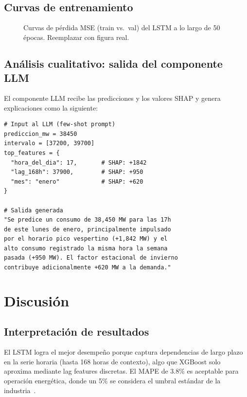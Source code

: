 \documentclass[10pt,twocolumn]{article}
\begin{document}
\subsection{Curvas de entrenamiento}

\begin{figure}[H]
  \centering
  \fbox{\rule{0pt}{3cm}\rule{\columnwidth-2\fboxsep}{0pt}}
  \caption{Curvas de pérdida MSE (train vs.\ val) del LSTM
           a lo largo de 50 épocas. Reemplazar con figura real.}
  \label{fig:curvas}
\end{figure}

\subsection{Análisis cualitativo: salida del componente LLM}

El componente LLM recibe las predicciones y los valores SHAP
y genera explicaciones como la siguiente:

\begin{lstlisting}[caption={Ejemplo de explicación generada por LLaMA-3.1}]
# Input al LLM (few-shot prompt)
prediccion_mw = 38450
intervalo = [37200, 39700]
top_features = {
  "hora_del_dia": 17,       # SHAP: +1842
  "lag_168h": 37900,        # SHAP: +950
  "mes": "enero"            # SHAP: +620
}

# Salida generada
"Se predice un consumo de 38,450 MW para las 17h
de este lunes de enero, principalmente impulsado
por el horario pico vespertino (+1,842 MW) y el
alto consumo registrado la misma hora la semana
pasada (+950 MW). El factor estacional de invierno
contribuye adicionalmente +620 MW a la demanda."
\end{lstlisting}

\section{Discusión}

\subsection{Interpretación de resultados}

El LSTM logra el mejor desempeño porque captura dependencias
de largo plazo en la serie horaria (hasta 168 horas de
contexto), algo que XGBoost solo aproxima mediante lag
features discretas. El MAPE de 3.8\% es aceptable para
operación energética, donde un 5\% se considera el umbral
estándar de la industria~\cite{hong2016probabilistic}.
\end{document}
